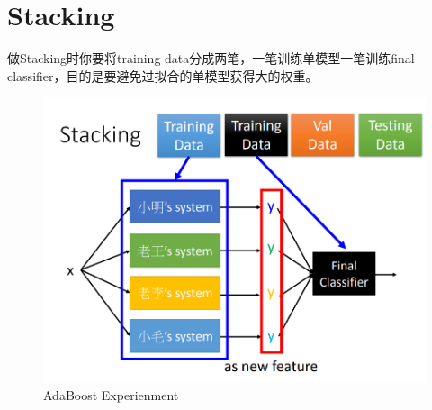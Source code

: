 \section{Stacking}
做Stacking时你要将training data分成两笔，一笔训练单模型一笔训练final classifier，目的是要避免过拟合的单模型获得大的权重。
\begin{figure}[H]
    \centerline{\includegraphics[scale=0.5]{Part1/Chapter/images/stacking.png}}
    \caption{AdaBoost Experienment}
\end{figure}
